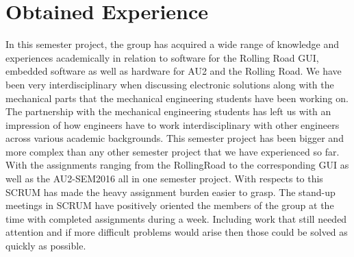 \chapter{Obtained Experience}
In this semester project, the group has acquired a wide range of knowledge and experiences academically in relation to software for the Rolling Road GUI, embedded software as well as hardware for AU2 and the Rolling Road. We have been very interdisciplinary when discussing electronic solutions along with the mechanical parts that the mechanical engineering students have been working on. The partnership with the mechanical engineering students has left us with an impression of how engineers have to work interdisciplinary with other engineers across various academic backgrounds. This semester project has been bigger and more complex than any other semester project that we have experienced so far. With the assignments ranging from the RollingRoad to the corresponding GUI as well as the AU2-SEM2016 all in one semester project. With respects to this SCRUM has made the heavy assignment burden easier to grasp. The stand-up meetings in SCRUM have positively oriented the members of the group at the time with completed assignments during a week. Including work that still needed attention and if more difficult problems would arise then those could be solved as quickly as possible.






